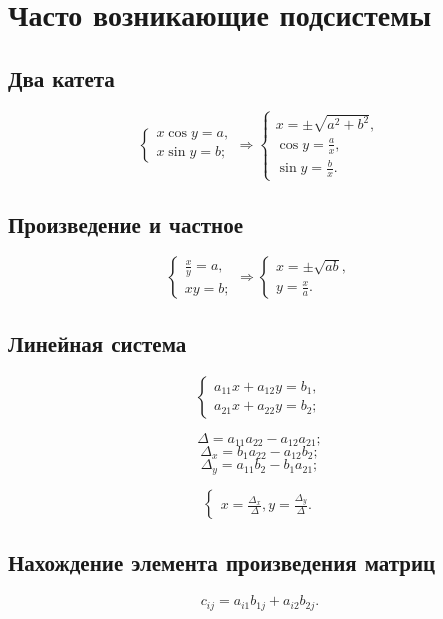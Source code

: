 \section{Часто возникающие подсистемы}

\subsection{Два катета}

$$
\begin{cases}
	x \cos y = a,\\
	x \sin y = b;
\end{cases}
\Rightarrow
\begin{cases}
	x = \pm \sqrt{a^2 + b^2},\\
	\cos y = \frac{a}{x},\\
	\sin y = \frac{b}{x}.
\end{cases}
$$

\subsection{Произведение и частное}

$$
\begin{cases}
	\frac{x}{y} = a,\\
	xy = b;
\end{cases}
\Rightarrow
\begin{cases}
	x = \pm \sqrt{ab},\\
	y = \frac{x}{a}.
\end{cases}
$$

\subsection{Линейная система}

$$\begin{cases}
	a_{11} x + a_{12} y = b_{1}, \\
	a_{21} x + a_{22} y = b_{2};
\end{cases}$$

$$\Delta = a_{11} a_{22} - a_{12} a_{21};$$
$$\Delta_x = b_{1} a_{22} - a_{12} b_{2};$$
$$\Delta_y = a_{11} b_{2} - b_{1} a_{21};$$

$$\begin{cases}
	x = \frac{\Delta_x}{\Delta},
	y = \frac{\Delta_y}{\Delta}.
\end{cases}$$

\subsection{Нахождение элемента произведения матриц}

$$c_{ij} = a_{i1} b_{1j} + a_{i2} b_{2j}.$$